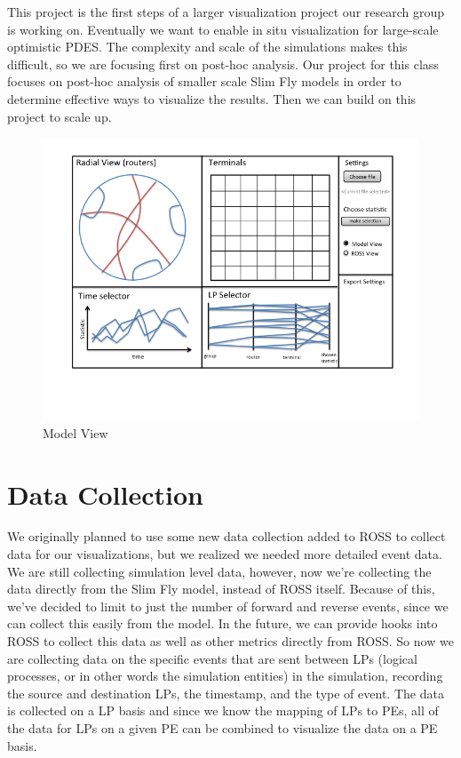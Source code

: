 \documentclass{acm_proc_article-sp}
\begin{document}
This project is the first steps of a larger visualization project our research group is working on.  Eventually we want to enable in situ visualization for large-scale optimistic PDES.  The complexity and scale of the simulations makes this difficult, so we are focusing first on post-hoc analysis.  Our project for this class focuses on post-hoc analysis of smaller scale Slim Fly models in order to determine effective ways to visualize the results.   Then we can build on this project to scale up.

\vspace{1cm}
\begin{figure}[!ht]
\centering
   \includegraphics[width=5.0in, clip=true, trim=0 1in 0 0]{../../figures/gui-diagram/Slide1.png}
\caption{Model View}
\label{model-view}
\end{figure}
\section{Data Collection}

We originally planned to use some new data collection added to ROSS to collect data for our visualizations, but we realized we needed more detailed event data. We are still collecting simulation level data, however, now we're collecting the data directly from the Slim Fly model, instead of ROSS itself.  Because of this, we've decided to limit to just the number of forward and reverse events, since we can collect this easily from the model.  In the future, we can provide hooks into ROSS to collect this data as well as other metrics directly from ROSS.  So now we are collecting data on the specific events that are sent between LPs (logical processes, or in other words the simulation entities) in the simulation, recording the source and destination LPs, the timestamp, and the type of event.  The data is collected on a LP basis and since we know the mapping of LPs to PEs, all of the data for LPs on a given PE can be combined to visualize the data on a PE basis.  
\end{document}
